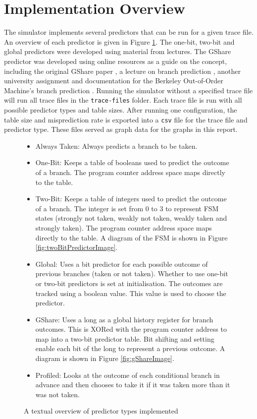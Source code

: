 \section{Implementation Overview}
The simulator implements several predictors that can be run for a given trace file. An overview of each predictor is given in Figure \ref{fig:predictors}. The one-bit, two-bit and global predictors were developed using material from lectures. The GShare predictor was developed using online resources as a guide on the concept, including the original GShare paper \cite{gshare_paper}, a lecture on branch prediction \cite{pittsburg_branch_prediction}, another university assignment \cite{gshare_assignment_edinburgh} and documentation for the Berkeley Out-of-Order Machine's branch prediction \cite{gshare_boom_core}. Running the simulator without a specified trace file will run all trace files in the \texttt{trace-files} folder. Each trace file is run with all possible predictor types and table sizes. After running one configuration, the table size and misprediction rate is exported into a \texttt{csv} file for the trace file and predictor type. These files served as graph data for the graphs in this report.

\begin{figure}[htbp]
    \begin{framed}
        \begin{itemize}
            \item Always Taken: Always predicts a branch to be taken.
            \item One-Bit: Keeps a table of booleans used to predict the outcome of a branch. The program counter address space maps directly to the table.
            \item Two-Bit: Keeps a table of integers used to predict the outcome of a branch. The integer is set from 0 to 3 to represent FSM states (strongly not taken, weakly not taken, weakly taken and strongly taken). The program counter address space maps directly to the table. A diagram of the FSM is shown in Figure \ref{fig:twoBitPredictorImage}.
            \item Global: Uses a bit predictor for each possible outcome of previous branches (taken or not taken). Whether to use one-bit or two-bit predictors is set at initialisation. The outcomes are tracked using a boolean value. This value is used to choose the predictor.
            \item GShare: Uses a long as a global history register for branch outcomes. This is XORed with the program counter address to map into a two-bit predictor table. Bit shifting and setting enable each bit of the long to represent a previous outcome. A diagram is shown in Figure \ref{fig:gShareImage}.
            \item Profiled: Looks at the outcome of each conditional branch in advance and then chooses to take it if it was taken more than it was not taken.
        \end{itemize}
    \end{framed}
    \caption{A textual overview of predictor types implemented}
    \label{fig:predictors}
\end{figure}

